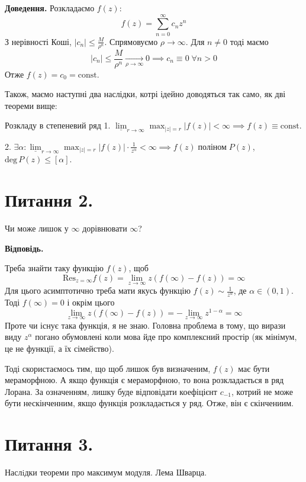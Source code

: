 \documentclass[14pt]{extarticle}
\begin{document}
\textbf{Доведення.} Розкладаємо $f(z)$:
\[
f(z) = \sum_{n=0}^{\infty} c_nz^n
\]
З нерівності Коші, $|c_n| \leq \frac{M}{\rho^{n}}$. Спрямовуємо $\rho \to \infty$. Для $n \neq 0$ тоді маємо
\[
|c_n| \leq \frac{M}{\rho^n} \xrightarrow[\rho \to \infty]{} 0 \implies c_n \equiv 0 \; \forall n > 0
\]
Отже $f(z) = c_0 = \text{const}$. 

Також, маємо наступні два наслідки, котрі ідейно доводяться так само, як дві теореми вище:

\begin{coll*}{Розкладу в степеневий ряд}
    1. $\underline{\lim}_{r \to \infty} \max_{|z|=r}|f(z)| < \infty \implies f(z) \equiv \text{const}$.  

2. $\exists \alpha: \underline{\lim}_{r \to \infty}\max_{|z|=r}|f(z)| \cdot \frac{1}{z^{\alpha}}<\infty \implies f(z) \; \text{поліном} \; P(z)$, $\text{deg}\, P(z) \leq [\alpha]$. 
\end{coll*}

\section*{Питання 2.}

Чи може лишок у $\infty$ дорівнювати $\infty$?

\textbf{Відповідь.}

Треба знайти таку функцію $f(z)$, щоб
\[
\text{Res}_{z=\infty}f(z)=\lim_{z \to \infty} z(f(\infty)-f(z)) = \infty
\]
Для цього асимптотично треба мати якусь функцію $f(z) \sim \frac{1}{z^{\alpha}}$, де $\alpha \in (0,1)$. Тоді $f(\infty)=0$ і окрім цього
\[
\lim_{z \to \infty} z(f(\infty)-f(z)) = -\lim_{z \to \infty} z^{1-\alpha} = \infty
\]
Проте чи існує така функція, я не знаю. Головна проблема в тому, що вирази виду $z^{\alpha}$ погано обумовлені коли мова йде про комплексний простір (як мінімум, це не функції, а їх сімейство).

Тоді скористаємось тим, що щоб лишок був визначеним, $f(z)$ має бути мераморфною. А якщо функція є мераморфною, то вона розкладається в ряд Лорана. За означенням, лишку буде відповідати коефіцієнт $c_{-1}$, котрий не може бути нескінченним, якщо функція розкладається у ряд. Отже, він є скінчениим.

\section*{Питання 3.}

Наслiдки теореми про максимум
модуля. Лема Шварца.
\end{document}

